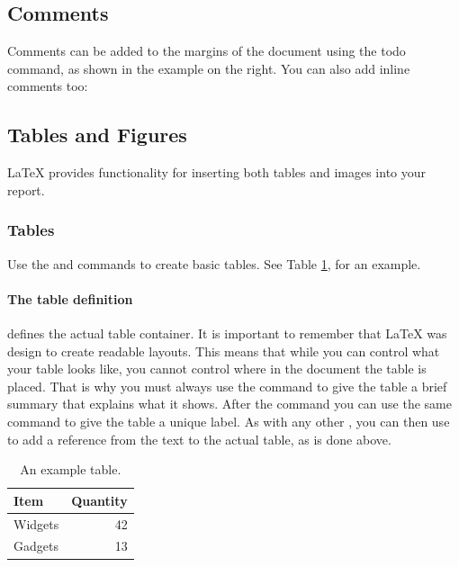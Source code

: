 \documentclass[a4paper,10pt]{ehu_webdev_report}
\begin{document}
\subsection{Comments}

Comments can be added to the margins of the document using the  todo command, as shown in the example on the right. You can also add inline comments too:


\subsection{Tables and Figures}

\LaTeX{} provides functionality for inserting both tables and images into your report.

\subsubsection{Tables}

Use the  and  commands to create basic tables. See Table \ref{tab:widgets}, for an example.

\paragraph{The table definition} defines the actual table container. It is important to remember that \LaTeX{} was design to create readable layouts. This means that while you can control what your table looks like, you cannot control where in the document the table is placed. That is why you must always use the  command to give the table a brief summary that explains what it shows. After the  command you can use the same  command to give the table a unique label. As with any other , you can then use  to add a reference from the text to the actual table, as is done above.

\begin{table}
  \caption{An example table.}
  \label{tab:widgets}
  \centering
  \begin{tabular}{l|r}
    \toprule
    Item & Quantity \\
    \midrule
    Widgets & 42 \\
    Gadgets & 13 \\
    \bottomrule
  \end{tabular}
\end{table}
\end{document}
